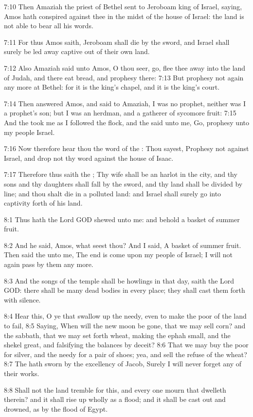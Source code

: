 7:10 Then Amaziah the priest of Bethel sent to Jeroboam king of
Israel, saying, Amos hath conspired against thee in the midst of the
house of Israel: the land is not able to bear all his words.

7:11 For thus Amos saith, Jeroboam shall die by the sword, and Israel
shall surely be led away captive out of their own land.

7:12 Also Amaziah said unto Amos, O thou seer, go, flee thee away into
the land of Judah, and there eat bread, and prophesy there: 7:13 But
prophesy not again any more at Bethel: for it is the king's chapel,
and it is the king's court.

7:14 Then answered Amos, and said to Amaziah, I was no prophet,
neither was I a prophet's son; but I was an herdman, and a gatherer of
sycomore fruit: 7:15 And the \LORD took me as I followed the flock, and
the \LORD said unto me, Go, prophesy unto my people Israel.

7:16 Now therefore hear thou the word of the \LORD: Thou sayest,
Prophesy not against Israel, and drop not thy word against the house
of Isaac.

7:17 Therefore thus saith the \LORD; Thy wife shall be an harlot in the
city, and thy sons and thy daughters shall fall by the sword, and thy
land shall be divided by line; and thou shalt die in a polluted land:
and Israel shall surely go into captivity forth of his land.

8:1 Thus hath the Lord GOD shewed unto me: and behold a basket of
summer fruit.

8:2 And he said, Amos, what seest thou? And I said, A basket of summer
fruit. Then said the \LORD unto me, The end is come upon my people of
Israel; I will not again pass by them any more.

8:3 And the songs of the temple shall be howlings in that day, saith
the Lord GOD: there shall be many dead bodies in every place; they
shall cast them forth with silence.

8:4 Hear this, O ye that swallow up the needy, even to make the poor
of the land to fail, 8:5 Saying, When will the new moon be gone, that
we may sell corn? and the sabbath, that we may set forth wheat, making
the ephah small, and the shekel great, and falsifying the balances by
deceit?  8:6 That we may buy the poor for silver, and the needy for a
pair of shoes; yea, and sell the refuse of the wheat?  8:7 The \LORD
hath sworn by the excellency of Jacob, Surely I will never forget any
of their works.

8:8 Shall not the land tremble for this, and every one mourn that
dwelleth therein? and it shall rise up wholly as a flood; and it shall
be cast out and drowned, as by the flood of Egypt.

